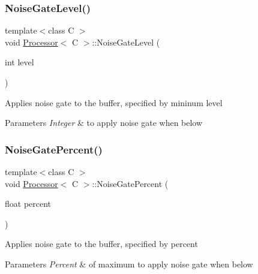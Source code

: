 \subsubsection{\texorpdfstring{Noise\+Gate\+Level()}{NoiseGateLevel()}}
{\footnotesize\ttfamily template$<$class C $>$ \\
void \hyperlink{classProcessor}{Processor}$<$ C $>$\+::Noise\+Gate\+Level (\begin{DoxyParamCaption}\item[{int}]{level }\end{DoxyParamCaption})\hspace{0.3cm}{\ttfamily [inline]}}

Applies noise gate to the buffer, specified by mininum level


\begin{DoxyParams}{Parameters}
{\em Integer} & to apply noise gate when below \\
\hline
\end{DoxyParams}
\mbox{\label{classProcessor_a357a5600fe3ecdfe1b9da4cc2afc6cf1}} 
\subsubsection{\texorpdfstring{Noise\+Gate\+Percent()}{NoiseGatePercent()}}
{\footnotesize\ttfamily template$<$class C $>$ \\
void \hyperlink{classProcessor}{Processor}$<$ C $>$\+::Noise\+Gate\+Percent (\begin{DoxyParamCaption}\item[{float}]{percent }\end{DoxyParamCaption})\hspace{0.3cm}{\ttfamily [inline]}}

Applies noise gate to the buffer, specified by percent


\begin{DoxyParams}{Parameters}
{\em Percent} & of maximum to apply noise gate when below \\
\hline
\end{DoxyParams}
\mbox{\label{classProcessor_a1125ca6169f0d51516c9479e275d7caa}} 
